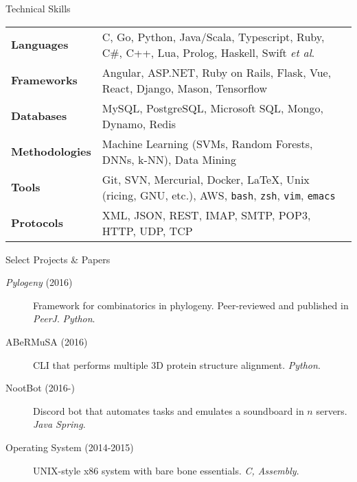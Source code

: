 \documentclass{resume} %
\begin{document}
\begin{rSection}{Technical Skills}

\begin{tabular}{ @{} >{\bfseries}l @{\hspace{1ex}} l }
Languages & C, Go, Python, Java/Scala, Typescript, Ruby, C\#, C++, Lua, Prolog, Haskell, Swift \textit{et al}. \\
Frameworks & Angular, ASP.NET, Ruby on Rails, Flask, Vue, React, Django, Mason, Tensorflow \\ 
Databases & MySQL, PostgreSQL, Microsoft SQL, Mongo, Dynamo, Redis \\
Methodologies & Machine Learning (SVMs, Random Forests, DNNs, k-NN), Data Mining \\
Tools & Git, SVN, Mercurial, Docker, \LaTeX, Unix (ricing, GNU, etc.), AWS, \texttt{bash}, \texttt{zsh}, \texttt{vim}, \texttt{emacs} \\
Protocols & XML, JSON, REST, IMAP, SMTP, POP3, HTTP, UDP, TCP
\end{tabular}

\end{rSection}


\begin{rSection}{Select Projects \& Papers}

\begin{description}
\item [\textit{Pylogeny} (2016)] Framework for combinatorics in phylogeny. Peer-reviewed and published in \textit{PeerJ}. \textit{Python}.
\item [ABeRMuSA (2016)] CLI that performs multiple 3D protein structure alignment. \textit{Python}.
\item [NootBot (2016-)] Discord bot that automates tasks and emulates a soundboard in $n$ servers. \textit{Java Spring}.
\item [Operating System (2014-2015)] UNIX-style x86 system with bare bone essentials. \textit{C, Assembly}.
\end{description}

\end{rSection}

\end{document}
